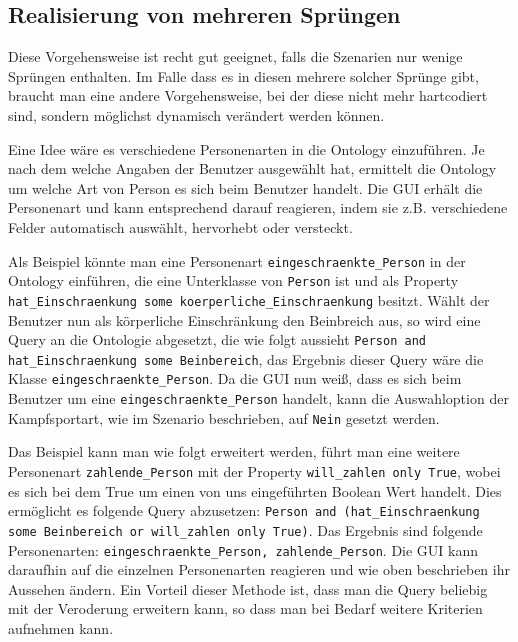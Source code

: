\subsection{Realisierung von mehreren Sprüngen}
Diese Vorgehensweise ist recht gut geeignet, falls die Szenarien nur wenige Sprüngen enthalten. Im Falle dass es in diesen mehrere solcher Sprünge gibt, braucht man eine andere Vorgehensweise, bei der diese nicht mehr hartcodiert sind, sondern möglichst dynamisch verändert werden können.

Eine Idee wäre es verschiedene Personenarten in die Ontology einzuführen. Je nach dem welche Angaben der Benutzer ausgewählt hat, ermittelt die Ontology um welche Art von Person es sich beim Benutzer handelt. Die GUI erhält die Personenart und kann entsprechend darauf reagieren, indem sie z.B. verschiedene Felder automatisch auswählt, hervorhebt oder versteckt.

Als Beispiel könnte man eine Personenart \lstinline"eingeschraenkte_Person" in der Ontology einführen, die eine Unterklasse von \lstinline"Person" ist und als Property \lstinline"hat_Einschraenkung some koerperliche_Einschraenkung" besitzt. Wählt der Benutzer nun als körperliche Einschränkung den Beinbreich aus, so wird eine Query an die Ontologie abgesetzt, die wie folgt aussieht \lstinline"Person and hat_Einschraenkung some Beinbereich", das Ergebnis dieser Query wäre die Klasse \lstinline"eingeschraenkte_Person". Da die GUI nun weiß, dass es sich beim Benutzer um eine \lstinline"eingeschraenkte_Person" handelt, kann die Auswahloption der Kampfsportart, wie im Szenario beschrieben, auf \lstinline"Nein" gesetzt werden.

Das Beispiel kann man wie folgt erweitert werden, führt man eine weitere Personenart \lstinline"zahlende_Person" mit der Property \lstinline"will_zahlen only True", wobei es sich bei dem True um einen von uns eingeführten Boolean Wert handelt. Dies ermöglicht es folgende Query abzusetzen: \lstinline"Person and (hat_Einschraenkung some Beinbereich or will_zahlen only True)". Das Ergebnis sind folgende Personenarten: \lstinline"eingeschraenkte_Person, zahlende_Person". Die GUI kann daraufhin auf die einzelnen Personenarten reagieren und wie oben beschrieben ihr Aussehen ändern. Ein Vorteil dieser Methode ist, dass man die Query beliebig mit der Veroderung erweitern kann, so dass man bei Bedarf weitere Kriterien aufnehmen kann.

